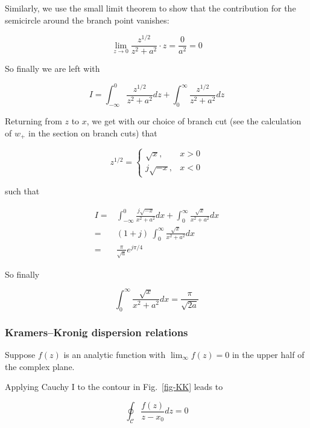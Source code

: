 Similarly, we use the small limit theorem to show that the contribution for the
semicircle around the branch point vanishes:

\begin{equation}
\lim_{z \to 0}\frac{z^{1/2}}{z^2+a^2} \cdot z = \frac{0}{a^2} = 0
\end{equation}

So finally we are left with

\begin{equation}
I = \int_{- \infty}^{0}\frac{z^{1/2}}{z^2+a^2}dz + 
\int_{0}^{\infty}\frac{z^{1/2}}{z^2+a^2}dz
\end{equation} 

Returning from $z$ to $x$, we get with our choice of branch cut (see the
calculation of $w_+$ in the section on branch cuts) that 

\begin{equation}
z^{1/2} = 
\begin{cases}
\sqrt{x}, & x > 0\\
j \sqrt{-x}, & x < 0
\end{cases}
\end{equation} 

such that

\begin{align}
I = & \int_{- \infty}^{0}\frac{j\sqrt{-x}}{x^2+a^2}dx +
\int_{0}^{\infty}\frac{\sqrt{x}}{x^2+a^2}dx \nonumber \\
 = & (1 + j) \ \int_{0}^{\infty}\frac{\sqrt{x}}{x^2+a^2}dx \nonumber \\
 = & \frac{\pi}{\sqrt{a}} e^{j \pi /4}
\end{align} 

So finally

\begin{equation}
\int_0^{\infty}\frac{\sqrt{x}}{x^2+a^2}dx = \frac{\pi}{\sqrt{2a}}
\end{equation}

\subsubsection{Kramers--Kronig dispersion relations}

Suppose $f(z)$ is an analytic function with $\lim_\infty f(z) = 0$ in the upper
half of the complex plane.

Applying Cauchy I to the contour in Fig.~\ref{fig-KK} leads to

\begin{equation}
\oint_{\mathcal{C}} \frac{f(z)}{z-x_0} dz = 0
\end{equation}

